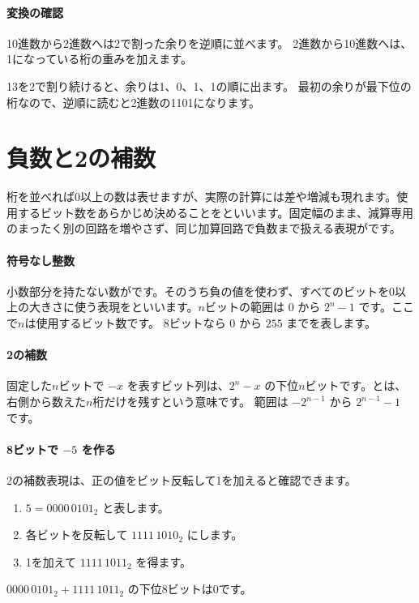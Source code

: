 \paragraph{変換の確認}
        10進数から2進数へは2で割った余りを逆順に並べます。
        2進数から10進数へは、1になっている桁の重みを加えます。

\par
\endgroup
\par
\endgroup

13を2で割り続けると、余りは1、0、1、1の順に出ます。
最初の余りが最下位の桁なので、逆順に読むと2進数の1101になります。


\section{負数と2の補数}
\label{sec:01-digital-computer-03}

桁を並べれば0以上の数は表せますが、実際の計算には差や増減も現れます。使用するビット数をあらかじめ決めることをといいます。固定幅のまま、減算専用のまったく別の回路を増やさず、同じ加算回路で負数まで扱える表現がです。

\begingroup
\begingroup
\paragraph{符号なし整数}
        小数部分を持たない数がです。そのうち負の値を使わず、すべてのビットを0以上の大きさに使う表現をといいます。$n$ビットの範囲は $0$ から $2^n-1$ です。ここで$n$は使用するビット数です。
        8ビットなら $0$ から $255$ までを表します。

\paragraph{2の補数}
        固定した$n$ビットで $-x$ を表すビット列は、$2^n-x$ の下位$n$ビットです。とは、右側から数えた$n$桁だけを残すという意味です。
        範囲は $-2^{n-1}$ から $2^{n-1}-1$ です。

\par
\endgroup
\medskip
\begingroup
\paragraph{8ビットで $-5$ を作る}
        2の補数表現は、正の値をビット反転して1を加えると確認できます。
        \begin{enumerate}
          \item $5=0000\,0101_2$ と表します。
          \item 各ビットを反転して $1111\,1010_2$ にします。
          \item 1を加えて $1111\,1011_2$ を得ます。
        \end{enumerate}
        $0000\,0101_2+1111\,1011_2$ の下位8ビットは0です。

